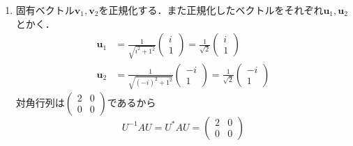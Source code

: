 \documentclass[dvipdfmx]{jsreport}
\begin{document}
\begin{souanswer}
\begin{enumerate}
\begin{enumerate}
	\item $\lambda= 0$のときの固有ベクトルを$\bm{v}_2= \begin{pmatrix}x_2\\ y_2\end{pmatrix}$とする．
\begin{equation*}
	\begin{pmatrix}1& i\\ -i& 1\end{pmatrix}\begin{pmatrix}x_2\\ y_2\end{pmatrix}= \begin{pmatrix}0\\ 0\end{pmatrix}
\end{equation*}
	$y_2= c_2 (c_2\colon 任意定数)$とすると，$x_2= -ic_2$.
	よって$\lambda= 2$のときの固有ベクトルは$\bm{v}_2= c_2\begin{pmatrix}-i\\ 1\end{pmatrix}$
\end{enumerate}
	\item 固有ベクトル$\bm{v}_1, \bm{v}_2$を正規化する．また正規化したベクトルをそれぞれ$\bm{u}_1, \bm{u}_2$とかく．
\begin{align*}
	\bm{u}_1&= \frac{1}{\sqrt{i^2+ 1^2}}\begin{pmatrix}i\\ 1\end{pmatrix}= \frac{1}{\sqrt{2}}\begin{pmatrix}i\\ 1\end{pmatrix}\\
	\bm{u}_2&= \frac{1}{\sqrt{(-i)^2+ 1^2}}\begin{pmatrix}-i\\ 1\end{pmatrix}= \frac{1}{\sqrt{2}}\begin{pmatrix}-i\\ 1\end{pmatrix}
\end{align*}
	対角行列は$\begin{pmatrix}2& 0\\ 0& 0\end{pmatrix}$であるから
\begin{equation*}
	U^{-1}AU= U^*AU= \begin{pmatrix}2& 0\\0& 0\end{pmatrix}

\end{equation*}
\end{enumerate}
\end{souanswer}
\end{document}

